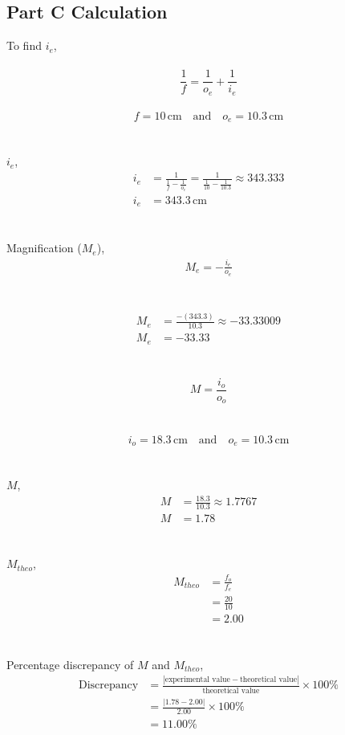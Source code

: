 \documentclass[a4paper,11pt]{article}
\begin{document}
\subsection*{Part C Calculation}
To find $ i_e$,\\
\\
\begin{equation*}
\frac{1}{f} = \frac{1}{o_e} + \frac{1}{i_e}
\end{equation*}
\\
\begin{equation*}
f = 10 \, \text{cm} \quad \text{and} \quad o_e = 10.3 \, \text{cm}
\end{equation*}\\
\\
 $i_e$,
\begin{align*}
i_e &= \frac{1}{\frac{1}{f} - \frac{1}{o_e}} = \frac{1}{\frac{1}{10} - \frac{1}{10.3}} \approx 343.333\\
 i_e &= 343.3 \, \text{cm}
\end{align*}\\
\\
Magnification ($M_e$),
\begin{align*}
M_e = -\frac{i_e}{o_e}
\end{align*}\\
\\
\begin{align*}
M_e &= \frac{-(343.3)}{10.3} \approx -33.33009 \\
M_e &= -33.33
\end{align*}\\
\\
\begin{equation*}
M = \frac{i_o}{o_o}
\end{equation*}\\
\\
\begin{equation*}
i_o = 18.3 \, \text{cm} \quad \text{and} \quad o_e = 10.3 \, \text{cm}
\end{equation*}\\
\\
 $M$,
\begin{align*}
M &= \frac{18.3}{10.3} \approx 1.7767\\
M &= 1.78
\end{align*}\\
\\
 $M_{theo}$,
\begin{align*}
M_{theo} &=\frac{f_o}{f_e}\\
 &= \frac{20}{10}\\
 &= 2.00
\end{align*}\\
\\
Percentage discrepancy of $M$ and $M_{theo}$,
\begin{align*}
\text{Discrepancy} &= \frac{|\text{experimental value} - \text{theoretical value}|}{\text{theoretical value}} \times 100\%\\
&= \frac{|1.78- 2.00|}{2.00} \times 100\%\\
&= 11.00\%
\end{align*}
\newpage
\end{document}
